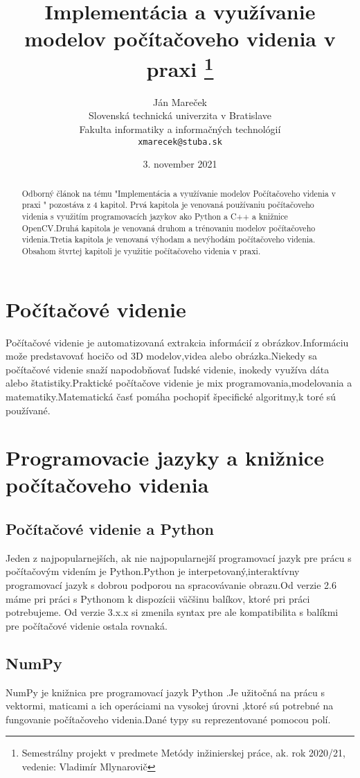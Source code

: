 \documentclass[10pt,twoside,slovak,a4paper]{coursepaper}
\title{Implementácia a využívanie modelov počítačoveho videnia v praxi \thanks{Semestrálny projekt v predmete Metódy inžinierskej práce, ak. rok 2020/21, vedenie: Vladimír Mlynarovič}} %
\author{Ján Mareček\\[2pt]
	{\small Slovenská technická univerzita v Bratislave}\\
	{\small Fakulta informatiky a informačných technológií}\\
	{\small \texttt{xmarecek@stuba.sk}}
	}
\date{\small 3. november 2021} %
\begin{document}
\maketitle


\begin{abstract}
Odborný článok na tému "Implementácia a využívanie modelov Počítačoveho videnia v praxi " pozostáva z 4 kapitol. Prvá kapitola je venovaná používaniu počítačoveho videnia s využitím programovacích jazykov ako Python a C++ a knižnice OpenCV.Druhá kapitola je venovaná druhom a trénovaniu modelov počítačoveho videnia.Tretia kapitola je venovaná výhodam a nevýhodám počítačoveho videnia. Obsahom štvrtej kapitoli je využitie počítačoveho videnia v praxi. 
\end{abstract}

\section{Počítačové videnie}
Počítačové videnie je automatizovaná extrakcia informácií z obrázkov.Informáciu može predstavovať hocičo od 3D modelov,videa alebo obrázka.Niekedy sa počítačové videnie snaží napodobňovať ľudské videnie, inokedy využíva dáta alebo štatistiky.Praktické počítačove videnie je mix programovania,modelovania a matematiky.Matematická časť pomáha pochopiť špecifické algoritmy,k toré sú používané.

\section{Programovacie jazyky a knižnice počítačoveho videnia}

\subsection{Počítačové videnie a Python} \label{ina:nejake}
Jeden z najpopularnejších, ak nie najpopularnejší programovací jazyk pre prácu s počítačovým videním je Python.Python je interpetovaný,interaktívny programovací jazyk s dobrou podporou na spracovávanie obrazu.Od verzie 2.6 máme pri práci s Pythonom k dispozícii väčšinu balíkov, ktoré pri práci potrebujeme. Od verzie 3.x.x si zmenila syntax pre ale kompatibilita s balíkmi pre počítačové videnie ostala rovnaká.\cite{Python-CV}

\subsection{NumPy} \label{ina:nejake}
NumPy je knižnica pre programovací jazyk Python .Je užitočná na prácu s vektormi,  maticami a ich operáciami na vysokej úrovni ,ktoré sú potrebné na fungovanie počítačoveho videnia.Dané typy su reprezentované pomocou polí.
\end{document}

